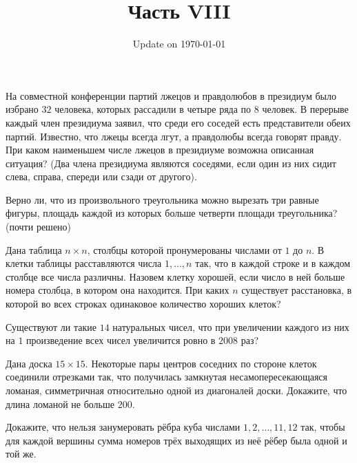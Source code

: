 \documentclass[12pt]{book}
\begin{document}
\fontsize{12}{12}\selectfont

\title{\bf \huge Часть VIII}
\date{Update on \today}
\maketitle 


\begin{task}
На совместной конференции партий лжецов и правдолюбов в президиум было избрано $32$ человека, которых рассадили в четыре ряда по $8$ человек. В перерыве каждый член президиума заявил, что среди его соседей есть представители обеих партий. Известно, что лжецы всегда лгут, а правдолюбы всегда говорят правду. При каком наименьшем числе лжецов в президиуме возможна описанная ситуация? (Два члена президиума являются соседями, если один из них сидит слева, справа, спереди или сзади от другого).
\end{task}

\begin{task}
Верно ли, что из произвольного треугольника можно вырезать три равные фигуры, площадь каждой из которых больше четверти площади треугольника? (почти решено)
\end{task}

\begin{task}
Дана таблица $n \times n$, столбцы которой пронумерованы числами от $1$ до $n$. В клетки таблицы расставляются числа $1, \dots, n$ так, что в каждой строке и в каждом столбце все числа различны. Назовем клетку хорошей, если число в ней больше номера столбца, в котором она находится. При каких $n$ существует расстановка, в которой во всех строках одинаковое количество хороших клеток?
\end{task}

\begin{task}
Существуют ли такие $14$ натуральных чисел, что при увеличении каждого из них на $1$ произведение всех чисел увеличится ровно в $2008$ раз?
\end{task}

\begin{task}
Дана доска $15 \times 15$. Некоторые пары центров соседних по стороне клеток соединили отрезками так, что получилась замкнутая несамопересекающаяся ломаная, симметричная относительно одной из диагоналей доски. Докажите, что длина ломаной не больше $200$.
\end{task}

\begin{task}
Докажите, что нельзя занумеровать рёбра куба числами $1, 2, \dots, 11, 12$ так, чтобы для каждой вершины сумма номеров трёх выходящих из неё рёбер была одной и той же. 
\end{task}
\end{document}
